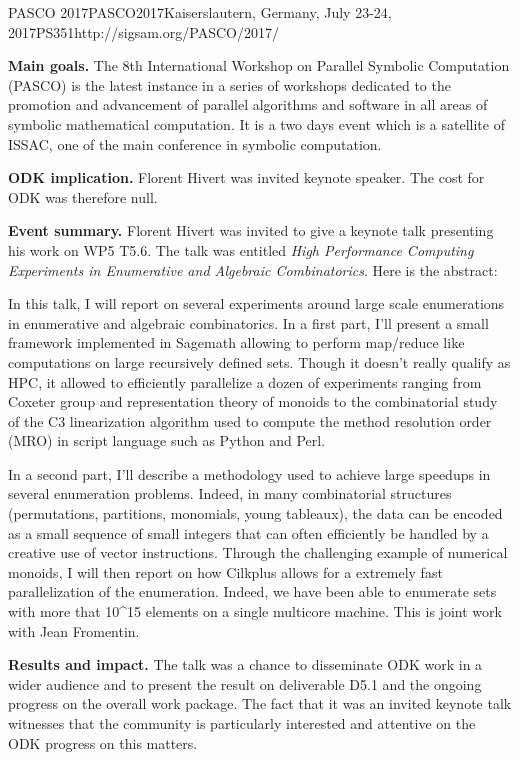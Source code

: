 \begin{event}{PASCO 2017}{PASCO2017}{Kaiserslautern, Germany, July 23-24, 2017}{PS}{35}{1}{http://sigsam.org/PASCO/2017/}

\textbf{Main goals.}
The 8th International Workshop on Parallel Symbolic Computation (PASCO) is the
latest instance in a series of workshops dedicated to the promotion and
advancement of parallel algorithms and software in all areas of symbolic
mathematical computation. It is a two days event which is a satellite of
ISSAC, one of the main conference in symbolic computation.

\textbf{ODK implication.} Florent Hivert was invited keynote speaker. The cost
for ODK was therefore null.

\textbf{Event summary.}
Florent Hivert was invited to give a keynote talk presenting his work on WP5
T5.6. The talk was entitled \emph{High Performance Computing Experiments in
  Enumerative and Algebraic Combinatorics}. Here is the abstract:

In this talk, I will report on several experiments around large scale
enumerations in enumerative and algebraic combinatorics.  In a first part,
I'll present a small framework implemented in Sagemath allowing to perform
map/reduce like computations on large recursively defined sets. Though it
doesn't really qualify as HPC, it allowed to efficiently parallelize a dozen
of experiments ranging from Coxeter group and representation theory of monoids
to the combinatorial study of the C3 linearization algorithm used to compute
the method resolution order (MRO) in script language such as Python and Perl.

In a second part, I'll describe a methodology used to achieve large speedups
in several enumeration problems. Indeed, in many combinatorial structures
(permutations, partitions, monomials, young tableaux), the data can be encoded
as a small sequence of small integers that can often efficiently be handled by
a creative use of vector instructions. Through the challenging example of
numerical monoids, I will then report on how Cilkplus allows for a extremely
fast parallelization of the enumeration. Indeed, we have been able to
enumerate sets with more that 10^15 elements on a single multicore machine.
This is joint work with Jean Fromentin.

\textbf{Results and impact.} The talk was a chance to disseminate ODK work in
a wider audience and to present the result on deliverable D5.1 and the ongoing
progress on the overall work package. The fact that it was an invited keynote
talk witnesses that the community is particularly interested and attentive on
the ODK progress on this matters.

\end{event}
